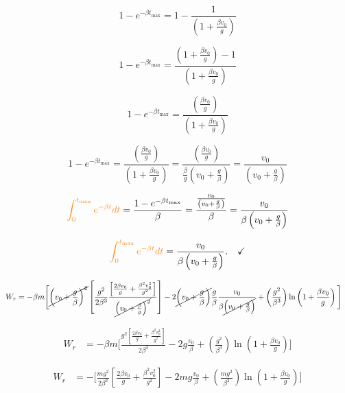 \documentclass[a4paper,12pt]{article}
\begin{document}
\begin{flushleft}
\[
1 - e^{-\beta t_\text{max}} = 1 - \frac{1}{\left( 1 + \frac{\beta v_0}{g} \right)}
\]

\[
1 - e^{-\beta t_\text{max}} = \frac{\left( 1 + \frac{\beta v_0}{g} \right) - 1}{\left( 1 + \frac{\beta v_0}{g} \right)}
\]

\[
1 - e^{-\beta t_\text{max}} = \frac{\left(\frac{\beta v_0}{g} \right)}{\left( 1 + \frac{\beta v_0}{g} \right)}
\]

\[
1 - e^{-\beta t_\text{max}} = \frac{\left(\frac{\beta v_0}{g} \right)}{\left( 1 + \frac{\beta v_0}{g} \right)} = \frac{\left(\frac{\beta v_0}{g} \right)}{\frac{\beta}{g}\left( v_0 + \frac{g}{\beta} \right)} = \frac{v_0}{\left( v_0 + \frac{g}{\beta} \right)}
\]

\[
\begin{aligned}
\textcolor{orange!90}{\int_0^{t_\text{max}} e^{-\beta t} dt } &= \frac{1 - e^{-\beta t_\text{max}}}{\beta} = \frac{\frac{v_0}{\left( v_0 + \frac{g}{\beta} \right)}}{\beta} = \frac{v_0}{\beta\left( v_0 + \frac{g}{\beta} \right)} \\
\end{aligned}
\]

\[
\begin{aligned}
\textcolor{orange!90}{\int_0^{t_\text{max}} e^{-\beta t} dt } &= \frac{v_0}{\beta\left( v_0 + \frac{g}{\beta} \right)}. \quad \checkmark \\
\end{aligned}
\]


\[
\begin{aligned}
W_r &= - \beta m \Bigg[ 
\cancel{\left(v_0 + \frac{g}{\beta}\right)^2} \left[\frac{g^2}{2 \beta^3 } \frac{\left[\frac{2\beta v_0}{g} + \frac{\beta^2 v_0^2}{g^2} \right]}{\cancel{\left( v_0 + \frac{\beta}{g} \right)^{2}}}\right]
- 2 \cancel{\left(v_0 + \frac{g}{\beta}\right)}\frac{g}{\beta} \frac{v_0}{\beta\cancel{\left( v_0 + \frac{g}{\beta} \right)}} 
+ \left(\frac{g^2}{\beta^3}\right)\ln \left( 1 + \frac{\beta v_0}{g} \right)
\Bigg]
\end{aligned}
\]

\[
\begin{aligned}
W_r &= - \beta m \Bigg[ 
\frac{g^2 \left[\frac{2\beta v_0}{g} + \frac{\beta^2 v_0^2}{g^2} \right]}{2 \beta^3}
- 2 g\frac{v_0}{\beta} 
+ \left(\frac{g^2}{\beta^3}\right)\ln \left( 1 + \frac{\beta v_0}{g} \right)
\Bigg]
\end{aligned}
\]

\[
\begin{aligned}
W_r &= - \Bigg[ 
\frac{m g^2}{2 \beta^2} \left[\frac{2\beta v_0}{g} + \frac{\beta^2 v_0^2}{g^2} \right]
- 2 mg\frac{v_0}{\beta} 
+ \left(\frac{m g^2}{\beta^2}\right)\ln \left( 1 + \frac{\beta v_0}{g} \right)
\Bigg]
\end{aligned}
\]


\end{flushleft}
\end{document}
